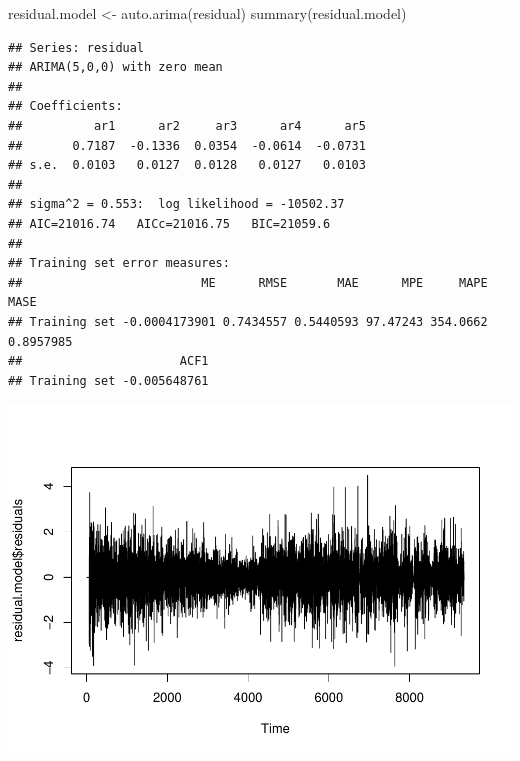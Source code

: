 \documentclass[
]{article}
\newenvironment{Shaded}{\begin{snugshade}}{\end{snugshade}}
\newcommand{\FunctionTok}[1]{\textcolor[rgb]{0.00,0.00,0.00}{#1}}
\newcommand{\NormalTok}[1]{#1}
\newcommand{\OtherTok}[1]{\textcolor[rgb]{0.56,0.35,0.01}{#1}}
\newcommand{\SpecialCharTok}[1]{\textcolor[rgb]{0.00,0.00,0.00}{#1}}
\begin{document}
\begin{Shaded}
\begin{Highlighting}[]
\NormalTok{residual.model }\OtherTok{\textless{}{-}} \FunctionTok{auto.arima}\NormalTok{(residual)}
\FunctionTok{summary}\NormalTok{(residual.model)}
\end{Highlighting}
\end{Shaded}

\begin{verbatim}
## Series: residual 
## ARIMA(5,0,0) with zero mean 
## 
## Coefficients:
##          ar1      ar2     ar3      ar4      ar5
##       0.7187  -0.1336  0.0354  -0.0614  -0.0731
## s.e.  0.0103   0.0127  0.0128   0.0127   0.0103
## 
## sigma^2 = 0.553:  log likelihood = -10502.37
## AIC=21016.74   AICc=21016.75   BIC=21059.6
## 
## Training set error measures:
##                         ME      RMSE       MAE      MPE     MAPE      MASE
## Training set -0.0004173901 0.7434557 0.5440593 97.47243 354.0662 0.8957985
##                      ACF1
## Training set -0.005648761
\end{verbatim}

\begin{Shaded}
\end{Shaded}

\includegraphics{STA202_report_files/figure-latex/unnamed-chunk-12-18.pdf}

\begin{Shaded}
\end{Shaded}
\end{document}
